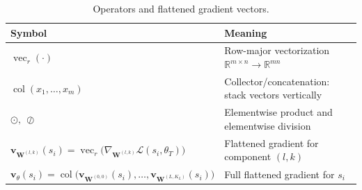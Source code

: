 \begin{table}[htb!]
    \centering
    \small
    \begin{tabular}{ll}
        \textbf{Symbol} & \textbf{Meaning} \\
        \hline
        $\operatorname{vec}_r(\cdot)$ & Row-major vectorization $\mathbb{R}^{m\times n}\!\to\!\mathbb{R}^{mn}$ \\
        $\operatorname{col}(x_1,\dots,x_m)$ & Collector/concatenation: stack vectors vertically \\
        $\odot,\ \oslash$ & Elementwise product and elementwise division \\
        $\mathbf{v}_{\mathbf{W}^{(l,k)}}(s_i)=\operatorname{vec}_r\big(\nabla_{\mathbf{W}^{(l,k)}}\mathcal{L}(s_i,\theta_T)\big)$ & Flattened gradient for component $(l,k)$ \\
        $\mathbf{v}_{\theta}(s_i)=\operatorname{col}\big(\mathbf{v}_{\mathbf{W}^{(0,0)}}(s_i),\dots,\mathbf{v}_{\mathbf{W}^{(L,K_L)}}(s_i)\big)$ & Full flattened gradient for $s_i$ \\
    \end{tabular}
    \caption{Operators and flattened gradient vectors.}
    \label{tab:nomenclature-ops}
\end{table}

